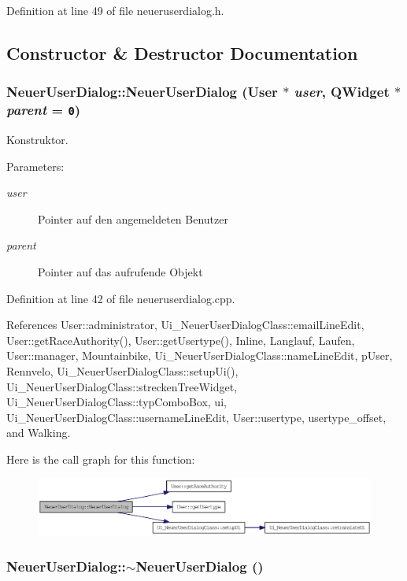 Definition at line 49 of file neueruserdialog.h.

\subsection{Constructor \& Destructor Documentation}
\hypertarget{class_neuer_user_dialog_6042fa6723528bcfb392d186079eda52}{
\subsubsection[NeuerUserDialog]{\setlength{\rightskip}{0pt plus 5cm}NeuerUserDialog::NeuerUserDialog ({\bf User} $\ast$ {\em user}, \/  QWidget $\ast$ {\em parent} = {\tt 0})}}
\label{class_neuer_user_dialog_6042fa6723528bcfb392d186079eda52}


Konstruktor. 

\begin{Desc}
\item[Parameters:]
\begin{description}
\item[{\em user}]Pointer auf den angemeldeten Benutzer \item[{\em parent}]Pointer auf das aufrufende Objekt \end{description}
\end{Desc}


Definition at line 42 of file neueruserdialog.cpp.

References User::administrator, Ui\_\-NeuerUserDialogClass::emailLineEdit, User::getRaceAuthority(), User::getUsertype(), Inline, Langlauf, Laufen, User::manager, Mountainbike, Ui\_\-NeuerUserDialogClass::nameLineEdit, pUser, Rennvelo, Ui\_\-NeuerUserDialogClass::setupUi(), Ui\_\-NeuerUserDialogClass::streckenTreeWidget, Ui\_\-NeuerUserDialogClass::typComboBox, ui, Ui\_\-NeuerUserDialogClass::usernameLineEdit, User::usertype, usertype\_\-offset, and Walking.

Here is the call graph for this function:\nopagebreak
\begin{figure}[H]
\begin{center}
\leavevmode
\includegraphics[width=321pt]{class_neuer_user_dialog_6042fa6723528bcfb392d186079eda52_cgraph}
\end{center}
\end{figure}
\hypertarget{class_neuer_user_dialog_43abc0928f1c44d630543df0af87b99a}{
\subsubsection[$\sim$NeuerUserDialog]{\setlength{\rightskip}{0pt plus 5cm}NeuerUserDialog::$\sim$NeuerUserDialog ()}}
\label{class_neuer_user_dialog_43abc0928f1c44d630543df0af87b99a}


